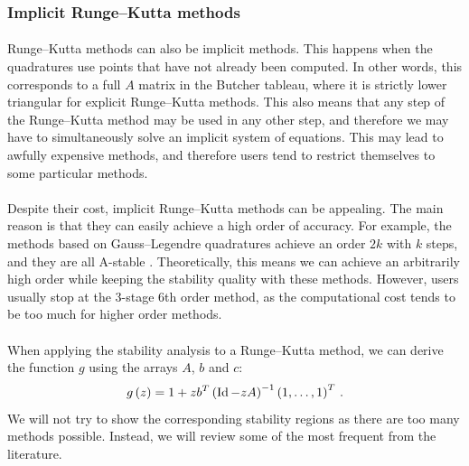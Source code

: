       \subsubsection{Implicit Runge--Kutta methods}

        \paragraph{}
        Runge--Kutta methods can also be implicit methods.
        This happens when the quadratures use points that have not already been computed.
        In other words, this corresponds to a full $A$ matrix in the Butcher tableau, where it is strictly lower triangular for explicit Runge--Kutta methods.
        This also means that any step of the Runge--Kutta method may be used in any other step, and therefore we may have to simultaneously solve an implicit system of equations.
        This may lead to awfully expensive methods, and therefore users tend to restrict themselves to some particular methods.

        \paragraph{}
        Despite their cost, implicit Runge--Kutta methods can be appealing.
        The main reason is that they can easily achieve a high order of accuracy.
        For example, the methods based on Gauss--Legendre quadratures achieve an order $2k$ with $k$ steps, and they are all A-stable \cite{Iserles2008}.
        Theoretically, this means we can achieve an arbitrarily high order while keeping the stability quality with these methods.
        However, users usually stop at the 3-stage 6th order method, as the computational cost tends to be too much for higher order methods.

        \paragraph{}
        When applying the stability analysis to a Runge--Kutta method, we can derive the function $g$ using the arrays $A$, $b$ and $c$:
        \begin{equation}
          g\left(z\right) = 1 + z {b}^T \left(\operatorname{Id} - zA\right)^{-1} {\left(1, \dots, 1\right)}^T \ .
        \end{equation}
        We will not try to show the corresponding stability regions as there are too many methods possible.
        Instead, we will review some of the most frequent from the literature.

